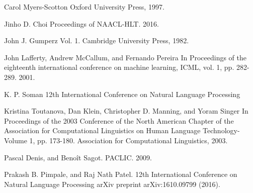 \documentclass[11pt,a4paper]{article}
\begin{document}
\begin{thebibliography}{}
Carol Myers-Scotton
\newblock Oxford University Press, 1997.

Jinho D. Choi
\newblock Proceedings of NAACL-HLT. 2016.

John J. Gumperz
\newblock Vol. 1. Cambridge University Press, 1982.

John Lafferty, Andrew McCallum, and Fernando Pereira
\newblock In Proceedings of the eighteenth international conference on machine learning, ICML, vol. 1, pp. 282-289. 2001.

K. P. Soman
\newblock 12th International Conference on Natural Language Processing

Kristina Toutanova, Dan Klein, Christopher D. Manning, and Yoram Singer
\newblock In Proceedings of the 2003 Conference of the North American Chapter of the Association for Computational Linguistics on Human Language Technology-Volume 1, pp. 173-180. Association for Computational Linguistics, 2003.


Pascal Denis, and Benoît Sagot.
\newblock PACLIC. 2009.
 
Prakash B. Pimpale, and Raj Nath Patel.
\newblock 12th International Conference on Natural Language Processing
\newblock arXiv preprint arXiv:1610.09799 (2016).




\end{thebibliography}
\end{document}
